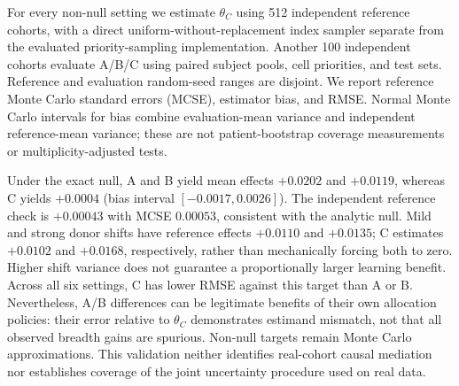 For every non-null setting we estimate $\theta_C$ using 512 independent
reference cohorts, with a direct uniform-without-replacement index sampler
separate from the evaluated priority-sampling implementation. Another 100
independent cohorts evaluate A/B/C using paired subject pools, cell priorities,
and test sets. Reference and evaluation random-seed ranges are disjoint.
We report reference Monte Carlo standard errors (MCSE), estimator bias, and
RMSE. Normal Monte Carlo intervals for bias combine evaluation-mean variance
and independent reference-mean variance; these are not patient-bootstrap
coverage measurements or multiplicity-adjusted tests.



Under the exact null, A and B yield mean effects $+0.0202$ and $+0.0119$,
whereas C yields $+0.0004$ (bias interval $[-0.0017,0.0026]$). The independent
reference check is $+0.00043$ with MCSE $0.00053$, consistent with the analytic
null. Mild and strong donor shifts have reference effects $+0.0110$ and
$+0.0135$; C estimates $+0.0102$ and $+0.0168$, respectively, rather than
mechanically forcing both to zero. Higher shift variance does not guarantee
a proportionally larger learning benefit. Across all six settings, C has lower
RMSE against this target than A or B. Nevertheless, A/B differences can be
legitimate benefits of their own allocation policies: their error relative to
$\theta_C$ demonstrates estimand mismatch, not that all observed breadth gains
are spurious. Non-null targets remain Monte Carlo approximations. This
validation neither identifies real-cohort causal mediation nor establishes
coverage of the joint uncertainty procedure used on real data.
